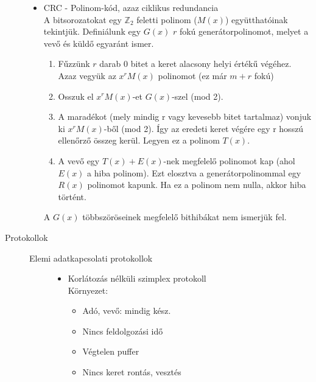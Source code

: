 \documentclass[margin=0px]{article}
\begin{document}
\begin{description}
\begin{itemize}
					\item CRC - Polinom-kód, azaz ciklikus redundancia \\
						A bitsorozatokat egy $\mathbb{Z}_2$ feletti polinom ($M(x)$) együtthatóinak tekintjük. Definiálunk egy $G(x)$ $r$ fokú generátorpolinomot, melyet a vevő és küldő egyaránt ismer.
						\begin{enumerate}
							\item Fűzzünk $r$ darab 0 bitet a keret alacsony helyi értékű végéhez. Azaz vegyük az $x^rM(x)$ polinomot (ez már $m+r$ fokú)
							\item Osszuk el $x^rM(x)$-et $G(x)$-szel (mod 2).
							\item A maradékot (mely mindig r vagy kevesebb bitet tartalmaz) vonjuk ki $x^rM(x)$-ből (mod 2). Így az eredeti keret végére egy r hosszú ellenőrző összeg kerül. Legyen ez a polinom $T(x)$.
							\item A vevő egy $T(x)+E(x)$-nek megfelelő polinomot kap (ahol $E(x)$ a hiba polinom). Ezt elosztva a generátorpolinommal egy $R(x)$ polinomot kapunk. Ha ez a polinom nem nulla, akkor hiba történt.
						\end{enumerate}
						A $G(x)$ többszöröseinek megfelelő bithibákat nem ismerjük fel.
				\end{itemize}
			\item[Protokollok] \hfill
				\begin{description}
					\item[Elemi adatkapcsolati protokollok] \hfill 
						 \begin{itemize}
						 	\item Korlátozás nélküli szimplex protokoll\\
							 	Környezet:
							 	\begin{itemize}
							 		\item Adó, vevő: mindig kész.
							 		\item Nincs feldolgozási idő
							 		\item Végtelen puffer
							 		\item Nincs keret rontás, vesztés
							 	\end{itemize}
							 	

\end{itemize}
\end{description}
\end{description}
\end{document}

